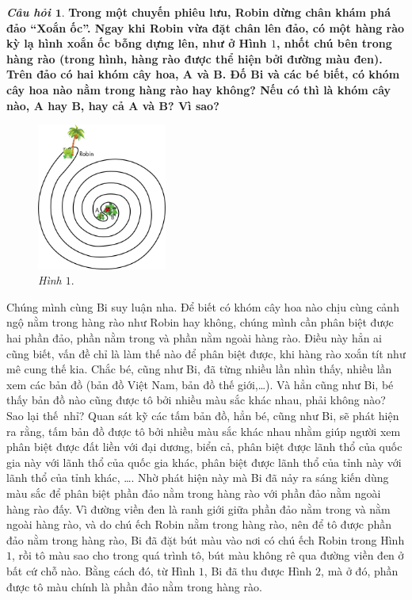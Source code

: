 	\textbf{\textit{Câu hỏi $\pmb{1.}$}} {\color{abc}\textbf{Trong một chuyến phiêu lưu,  Robin dừng chân khám phá đảo “Xoắn ốc”. Ngay khi Robin vừa đặt chân lên đảo, có một hàng rào kỳ lạ hình xoắn ốc bỗng dựng lên, như ở Hình $1$, nhốt chú bên trong hàng rào (trong hình, hàng rào được thể hiện bởi đường màu đen). Trên đảo có hai khóm cây hoa, $\pmb 
	A$ và $\pmb B$. Đố Bi và các bé biết, có khóm cây hoa nào nằm trong hàng rào hay không? Nếu có thì là khóm cây nào, $\pmb A$ hay $\pmb B$, hay cả $\pmb A$ và $\pmb B$? Vì sao?}}
	\begin{figure}[H]
		\centering
		\vspace*{-5pt}
		\captionsetup{labelformat= empty, justification=centering}
		\includegraphics[width=0.38\textwidth]{1}
		\caption{\small\textit{Hình $1.$}}
		\vspace*{-10pt}
	\end{figure}
	Chúng mình cùng Bi suy luận nha.
	\vskip 0.1cm
	Để biết có khóm cây hoa nào chịu cùng cảnh ngộ nằm trong hàng rào như Robin hay không, chúng mình cần phân biệt được hai phần đảo, phần nằm trong và phần nằm ngoài hàng rào. Điều này hẳn ai cũng biết, vấn đề chỉ là làm thế nào để phân biệt được, khi hàng rào xoắn tít như mê cung thế kia.
	\vskip 0.1cm
	Chắc bé, cũng như Bi, đã từng nhiều lần nhìn thấy, nhiều lần xem các bản đồ (bản đồ Việt Nam, bản đồ thế giới,\ldots). Và hẳn cũng như Bi, bé thấy bản đồ nào cũng được tô bởi nhiều màu sắc khác nhau, phải không nào? Sao lại thế~nhỉ?
	\vskip 0.1cm
	Quan sát kỹ các tấm bản đồ, hẳn bé, cũng như Bi, sẽ phát hiện ra rằng, tấm bản đồ được tô bởi nhiều màu sắc khác nhau nhằm giúp người xem phân biệt được đất liền với đại dương, biển cả, phân biệt được lãnh thổ của quốc gia này với lãnh thổ của quốc gia khác, phân biệt được lãnh thổ của tỉnh này với lãnh thổ của tỉnh khác, \ldots. Nhờ phát hiện này mà Bi đã nảy ra sáng kiến dùng màu sắc để phân biệt phần đảo nằm trong hàng rào với phần đảo nằm ngoài hàng rào đấy.
	\vskip 0.1cm
	Vì đường viền đen là ranh giới giữa phần đảo nằm trong và nằm ngoài hàng rào, và do chú ếch Robin nằm trong hàng rào, nên để tô được phần đảo nằm trong hàng rào, Bi đã đặt bút màu vào nơi có chú ếch Robin trong Hình $1$, rồi tô màu sao cho trong quá trình tô, bút màu không rê qua đường viền đen ở bất cứ chỗ nào. Bằng cách đó, từ Hình $1$, Bi đã thu được Hình $2$, mà ở đó, phần được tô màu chính là phần đảo nằm trong hàng rào.

